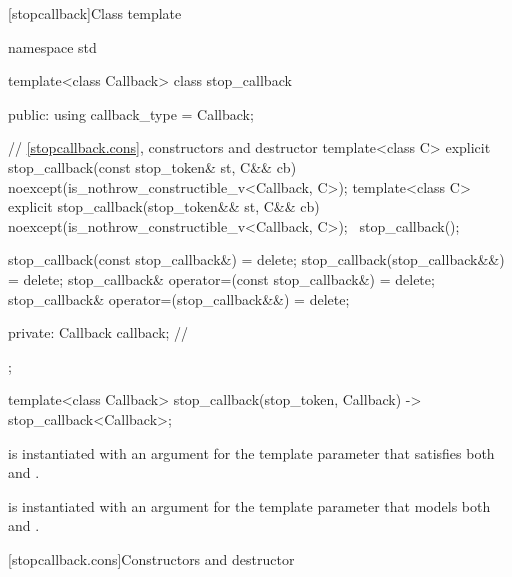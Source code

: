 %
[stopcallback]{Class template }

\pnum
{}%
\begin{codeblock}
namespace std {
  template<class Callback>
  class stop_callback {
  public:
    using callback_type = Callback;

    // \ref{stopcallback.cons}, constructors and destructor
    template<class C>
    explicit stop_callback(const stop_token& st, C&& cb)
        noexcept(is_nothrow_constructible_v<Callback, C>);
    template<class C>
    explicit stop_callback(stop_token&& st, C&& cb)
        noexcept(is_nothrow_constructible_v<Callback, C>);
    ~stop_callback();

    stop_callback(const stop_callback&) = delete;
    stop_callback(stop_callback&&) = delete;
    stop_callback& operator=(const stop_callback&) = delete;
    stop_callback& operator=(stop_callback&&) = delete;

  private:
    Callback callback;      // \expos
  };

  template<class Callback>
  stop_callback(stop_token, Callback) -> stop_callback<Callback>;
}
\end{codeblock}

\pnum
\mandates
{} is instantiated with an argument for the
template parameter 
that satisfies both 
and .

\pnum
\expects
{} is instantiated with an argument for the
template parameter 
that models both 
and .


[stopcallback.cons]{Constructors and destructor}

